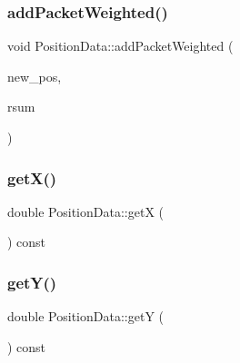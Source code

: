\mbox{\label{class_position_data_ad96efe1394b2ae79f24fe4e934f11307}} 
\subsubsection{\texorpdfstring{add\+Packet\+Weighted()}{addPacketWeighted()}\hspace{0.1cm}{\footnotesize\ttfamily [2/2]}}
{\footnotesize\ttfamily void Position\+Data\+::add\+Packet\+Weighted (\begin{DoxyParamCaption}\item[{\hyperlink{class_position_data}{Position\+Data}}]{new\+\_\+pos,  }\item[{double}]{rsum }\end{DoxyParamCaption})}

\mbox{\label{class_position_data_a87eb59dc791fcdeec60820092959dd98}} 
\subsubsection{\texorpdfstring{get\+X()}{getX()}}
{\footnotesize\ttfamily double Position\+Data\+::getX (\begin{DoxyParamCaption}{ }\end{DoxyParamCaption}) const\hspace{0.3cm}{\ttfamily [inline]}}

\mbox{\label{class_position_data_a2eefc1ca36082bf9e53999c86582b1d1}} 
\subsubsection{\texorpdfstring{get\+Y()}{getY()}}
{\footnotesize\ttfamily double Position\+Data\+::getY (\begin{DoxyParamCaption}{ }\end{DoxyParamCaption}) const\hspace{0.3cm}{\ttfamily [inline]}}



